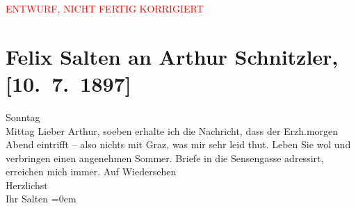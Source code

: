 
\begin{center}
            \textcolor{red}{ENTWURF, NICHT FERTIG KORRIGIERT}
                      \end{center}
            
         
         \renewcommand{\erwaehntePersonen}{Personen: Leopold Ferdinand Salvator Wölfling}
         \renewcommand{\erwaehnteOrte}{Orte: Graz, Sensengasse, Wien}
         \renewcommand{\erwaehnteWerke}{}
               \section[Felix Salten an Arthur Schnitzler, {[}10. 7. 1897{]}]{ Felix Salten an Arthur Schnitzler, {[}10. 7. 1897{]}}\nopagebreak{}\rehead{ }\begin{ledgroupsized}[t]{13cm}\normalsize\beginnumbering \toendnotes[C]{\smallbreak\pagebreak[2]} 
\toendnotes[C]{\smallbreak}\pstart
           \raggedleft{}{\pb}Sonntag{\\}Mittag\pend
           \pstart
           Lieber Arthur, soeben erhalte ich die Nachricht, dass der Erzh.morgen Abend eintrifft – also nichts mit Graz, was mir sehr leid thut. Leben Sie wol und verbringen einen angenehmen
               Sommer. Briefe in die Sensengasse adressirt,
               erreichen mich immer.\pend
           \pstart
           Auf Wiedersehen {\\[\baselineskip]}Herzlichst {\\[\baselineskip]}Ihr \spacefill\mbox{Salten}\pend
           \leftskip=0em{}
         
         \endnumbering{}\end{ledgroupsized}\begin{anhang}\end{anhang}\newcommand{\dateiname}{L03279}\newcommand{\titel}{Felix Salten an Arthur Schnitzler, [10. 7. 1897]}\newcommand{\editorInnen}{Martin Anton Müller und Laura Untner}
      